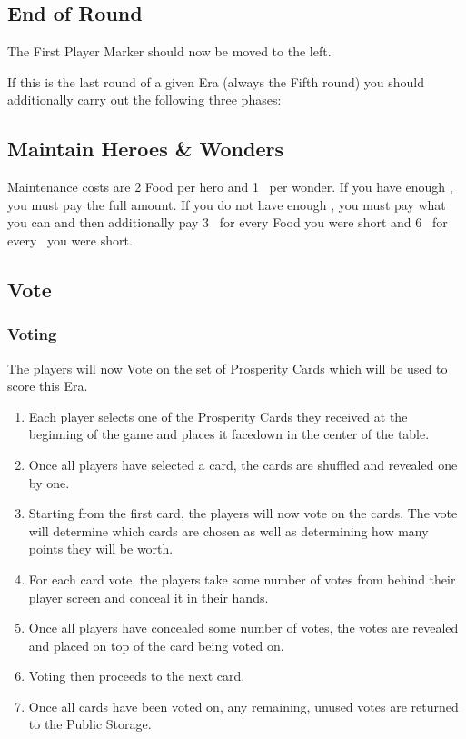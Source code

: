 \documentclass[10pt,twocolumn]{article}
\begin{document}
\subsection{End of Round}
The First Player Marker should now be moved to the left.

If this is the last round of a given Era (always the Fifth round) you should additionally carry out the following three phases:

\subsection{Maintain Heroes \& Wonders}
Maintenance costs are 2 Food per hero and 1 \mineral\ per wonder. If you have enough \goods, you must pay the full amount. If you do not have enough \goods, you must pay what you can and then additionally pay 3 \vps\ for every Food you were short and 6 \vps\ for every \mineral\ you were short.
\subsection{Vote}
\subsubsection{Voting}
The players will now Vote on the set of Prosperity Cards which will be used to score this Era.
\begin{enumerate}
\item Each player selects one of the Prosperity Cards they received at the beginning of the game and places it facedown in the center of the table.
\item Once all players have selected a card, the cards are shuffled and revealed one by one.
\item Starting from the first card, the players will now vote on the cards. The vote will determine which cards are chosen as well as determining how many points they will be worth.
\item For each card vote, the players take some number of votes from behind their player screen and conceal it in their hands. 
\item Once all players have concealed some number of votes, the votes are revealed and placed on top of the card being voted on.
\item Voting then proceeds to the next card.
\item Once all cards have been voted on, any remaining, unused votes are returned to the Public Storage.
\end{enumerate}
\end{document}
